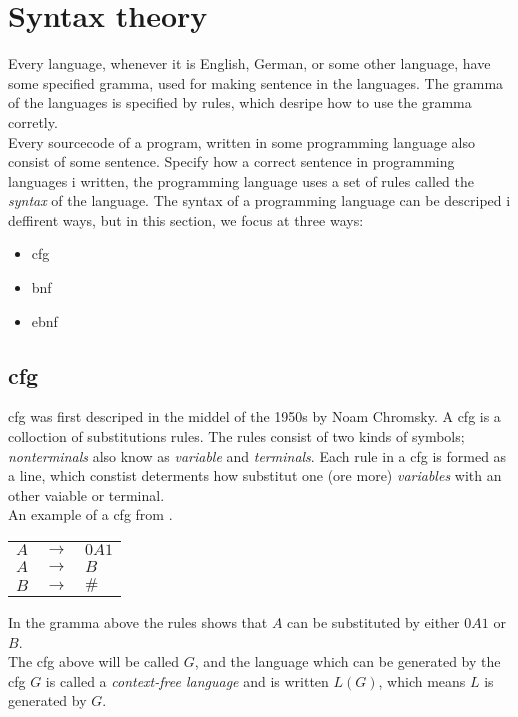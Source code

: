 \pagebreak
\section{Syntax theory}
Every language, whenever it is English, German, or some other language, have some specified gramma, used for making sentence in the languages. The gramma of the languages is specified by rules, which desripe how to use the gramma corretly.   \\
Every sourcecode of a program, written in some programming language also consist of some sentence. Specify how a correct sentence in programming languages i written, the programming language uses a set of rules called the \textit{syntax} of the language. The syntax of a programming language can be descriped i deffirent ways, but in this section, we focus at three ways:
\begin{itemize}
\item{\ac{cfg}}
\item{\ac{bnf}}
\item{\ac{ebnf}}
\end{itemize}

\subsection{\ac{cfg}}
\ac{cfg} was first descriped in the middel of the 1950s by Noam Chromsky. A \ac{cfg} is a colloction of substitutions rules. The rules consist of two kinds of symbols; \textit{nonterminals} also know as \textit{variable} and \textit{terminals}. Each rule in a \ac{cfg} is formed as a line, which constist determents how substitut one (ore more) \textit{variables} with an other vaiable or terminal. \\
An example of a \ac{cfg} from \cite{syntax_book}.

\begin{tabular}{l l l}
$A$ & $\rightarrow$ & $0A1$ \\
$A$ & $\rightarrow$ & $B$ \\
$B$ & $\rightarrow$ & $\#$ \\
\end{tabular}

In the gramma above the rules shows that $A$ can be substituted by either $0A1$ or $B$. \\
The \ac{cfg} above will be called $G$, and the language which can be generated by the \ac{cfg} $G$ is called a \textit{context-free language} and is written $L(G)$, which means $L$ is generated by $G$.

